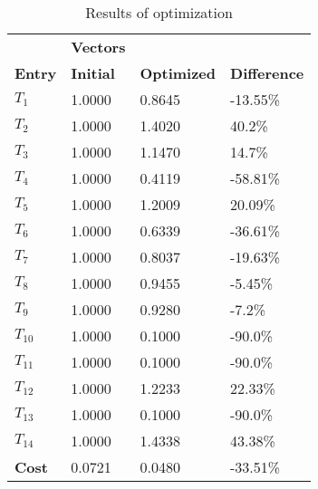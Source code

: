 \begin{table}[H]
\centering
\begin{tabular}{llll}
\textbf{}      & \cellcolor[HTML]{EFEFEF}\textbf{Vectors} & \textbf{} & \textbf{}         \\
\rowcolor[HTML]{EFEFEF} 
\textbf{Entry} & \textbf{Initial} & \textbf{Optimized} & \textbf{Difference} \\
$T_1$ & 1.0000 & 0.8645 & -13.55\% \\ 
$T_2$ & 1.0000 & 1.4020 & 40.2\% \\ 
$T_3$ & 1.0000 & 1.1470 & 14.7\% \\ 
$T_4$ & 1.0000 & 0.4119 & -58.81\% \\ 
$T_5$ & 1.0000 & 1.2009 & 20.09\% \\ 
$T_6$ & 1.0000 & 0.6339 & -36.61\% \\ 
$T_7$ & 1.0000 & 0.8037 & -19.63\% \\ 
$T_8$ & 1.0000 & 0.9455 & -5.45\% \\ 
$T_9$ & 1.0000 & 0.9280 & -7.2\% \\ 
$T_10$ & 1.0000 & 0.1000 & -90.0\% \\ 
$T_11$ & 1.0000 & 0.1000 & -90.0\% \\ 
$T_12$ & 1.0000 & 1.2233 & 22.33\% \\ 
$T_13$ & 1.0000 & 0.1000 & -90.0\% \\ 
$T_14$ & 1.0000 & 1.4338 & 43.38\% \\ 
\rowcolor[HTML]{EFEFEF} 
\textbf{Cost}  & 0.0721 & 0.0480 & -33.51\% \\ 
\end{tabular}
\caption{Results of optimization}
\label{tab:OptimizationAnalysis}
\end{table}